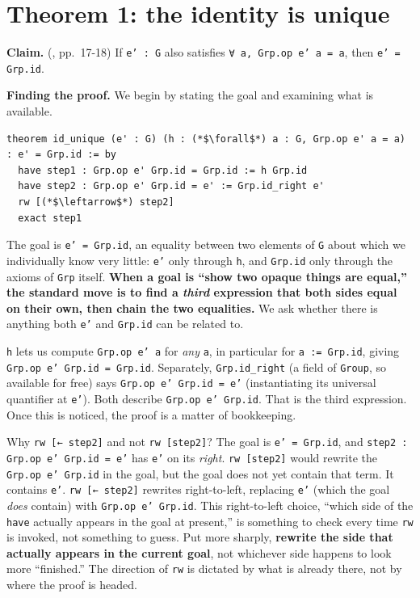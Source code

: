 \section{Theorem 1: the identity is unique}\label{sec:08-group-theorems:02-theorem-1:1}

\textbf{Claim.} (\cite{DummitFoote2003}, pp.~17-18) If \texttt{e' : G} also satisfies \texttt{∀ a, Grp.op e' a = a}, then \texttt{e' = Grp.id}.

\textbf{Finding the proof.} We begin by stating the goal and examining what is available.

\begin{lstlisting}
theorem id_unique (e' : G) (h : (*$\forall$*) a : G, Grp.op e' a = a) : e' = Grp.id := by
  have step1 : Grp.op e' Grp.id = Grp.id := h Grp.id
  have step2 : Grp.op e' Grp.id = e' := Grp.id_right e'
  rw [(*$\leftarrow$*) step2]
  exact step1
\end{lstlisting}

The goal is \texttt{e' = Grp.id}, an equality between two elements of \texttt{G} about which we individually know very little: \texttt{e'} only through \texttt{h}, and \texttt{Grp.id} only through the axioms of \texttt{Grp} itself. \textbf{When a goal is ``show two opaque things are equal,'' the standard move is to find a \emph{third} expression that both sides equal on their own, then chain the two equalities.} We ask whether there is anything both \texttt{e'} and \texttt{Grp.id} can be related to.

\texttt{h} lets us compute \texttt{Grp.op e' a} for \emph{any} \texttt{a}, in particular for \texttt{a := Grp.id}, giving \texttt{Grp.op e' Grp.id = Grp.id}. Separately, \texttt{Grp.id\_\allowbreak{}right} (a field of \texttt{Group}, so available for free) says \texttt{Grp.op e' Grp.id = e'} (instantiating its universal quantifier at \texttt{e'}). Both describe \texttt{Grp.op e' Grp.id}. That is the third expression. Once this is noticed, the proof is a matter of bookkeeping.

Why \texttt{rw [← step2]} and not \texttt{rw [step2]}? The goal is \texttt{e' = Grp.id}, and \texttt{step2 : Grp.op e' Grp.id = e'} has \texttt{e'} on its \emph{right}. \texttt{rw [step2]} would rewrite the \texttt{Grp.op e' Grp.id} in the goal, but the goal does not yet contain that term. It contains \texttt{e'}. \texttt{rw [← step2]} rewrites right-to-left, replacing \texttt{e'} (which the goal \emph{does} contain) with \texttt{Grp.op e' Grp.id}. This right-to-left choice, ``which side of the \texttt{have} actually appears in the goal at present,'' is something to check every time \texttt{rw} is invoked, not something to guess. Put more sharply, \textbf{rewrite the side that actually appears in the current goal}, not whichever side happens to look more ``finished.'' The direction of \texttt{rw} is dictated by what is already there, not by where the proof is headed.

